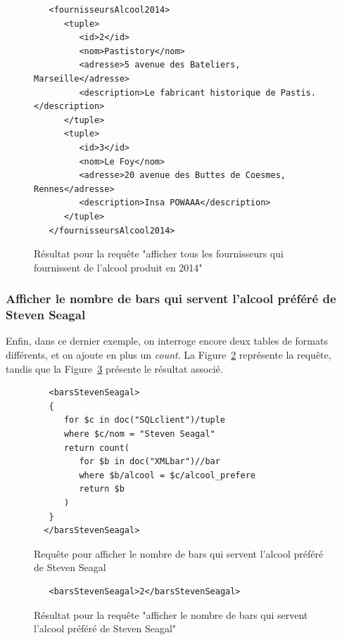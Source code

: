\documentclass[a4paper,10pt]{article}
\newcommand{\fref}[1]{Figure~\ref{#1}}
\begin{document}
\begin{figure}[ht!]
\begin{verbatim}
   <fournisseursAlcool2014>
      <tuple>
         <id>2</id>
         <nom>Pastistory</nom>
         <adresse>5 avenue des Bateliers, Marseille</adresse>
         <description>Le fabricant historique de Pastis.</description>
      </tuple>
      <tuple>
         <id>3</id>
         <nom>Le Foy</nom>
         <adresse>20 avenue des Buttes de Coesmes, Rennes</adresse>
         <description>Insa POWAAA</description>
      </tuple>
   </fournisseursAlcool2014>
\end{verbatim}
\caption{Résultat pour la requête "afficher tous les fournisseurs qui fournissent de l'alcool produit en 2014"}
\label{lst:resultatTest4}
\end{figure}



\FloatBarrier
\subsubsection{Afficher le nombre de bars qui servent l'alcool préféré de Steven Seagal}

Enfin, dans ce dernier exemple, on interroge encore deux tables de formats différents, et on ajoute en plus un \textit{count}. La \fref{lst:requeteTest5} représente la requête, tandis que la \fref{lst:resultatTest5} présente le résultat associé.

\begin{figure}[ht!]
\begin{verbatim}
   <barsStevenSeagal>
   {
      for $c in doc("SQLclient")/tuple
      where $c/nom = "Steven Seagal"
      return count(
         for $b in doc("XMLbar")//bar
         where $b/alcool = $c/alcool_prefere
         return $b
      )
   }
  </barsStevenSeagal>
\end{verbatim}
\caption{Requête pour afficher le nombre de bars qui servent l'alcool préféré de Steven Seagal}
\label{lst:requeteTest5}
\end{figure}

\begin{figure}[ht!]
\begin{verbatim}
   <barsStevenSeagal>2</barsStevenSeagal>
\end{verbatim}
\caption{Résultat pour la requête "afficher le nombre de bars qui servent l'alcool préféré de Steven Seagal"}
\label{lst:resultatTest5}
\end{figure}
\end{document}
